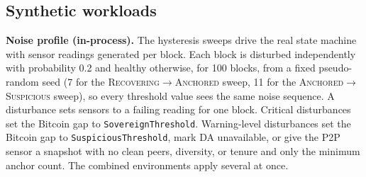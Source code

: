 \subsection*{Synthetic workloads}

\textbf{Noise profile (in-process).} The hysteresis sweeps drive the real
state machine with sensor readings generated per block. Each block is
disturbed independently with probability 0.2 and healthy otherwise, for 100
blocks, from a fixed pseudo-random seed (7 for the
\textsc{Recovering}$\to$\textsc{Anchored} sweep, 11 for the
\textsc{Anchored}$\to$\textsc{Suspicious} sweep), so every threshold value
sees the same noise sequence. A disturbance sets sensors to a failing
reading for one block. Critical disturbances set the Bitcoin gap to
\texttt{SovereignThreshold}. Warning-level disturbances set the Bitcoin gap
to \texttt{SuspiciousThreshold}, mark DA unavailable, or give the P2P sensor
a snapshot with no clean peers, diversity, or tenure and only the minimum
anchor count. The combined environments apply several at once.

